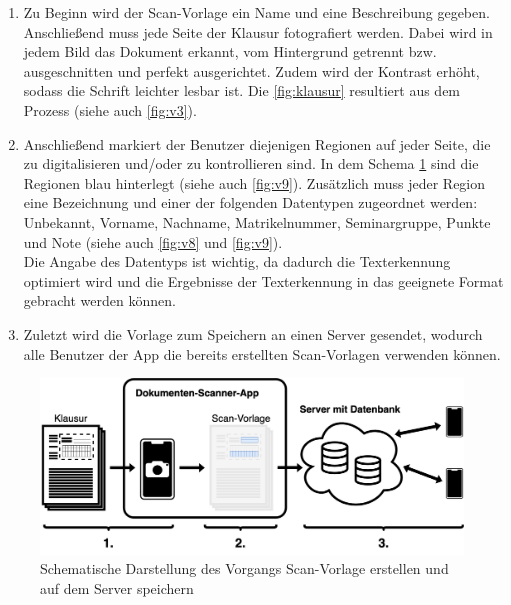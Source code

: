 \documentclass[notables, nomenclature, oneside, 150]{HSMW-Thesis}
\begin{document}
		\begin{enumerate}
			\item Zu Beginn wird der Scan-Vorlage ein Name und eine Beschreibung gegeben. Anschließend muss jede Seite der Klausur fotografiert werden. Dabei wird in jedem Bild das Dokument erkannt, vom Hintergrund getrennt bzw. ausgeschnitten und perfekt ausgerichtet. Zudem wird der Kontrast erhöht, sodass die Schrift leichter lesbar ist. Die \autoref{fig:klausur} resultiert aus dem Prozess (siehe auch \autoref{fig:v3}). 
		
			\item Anschließend markiert der Benutzer diejenigen Regionen auf jeder Seite, die zu digitalisieren und/oder zu kontrollieren sind. In dem Schema \ref{fig:schema1} sind die Regionen blau hinterlegt (siehe auch \autoref{fig:v9}). Zusätzlich muss jeder Region eine Bezeichnung und einer der folgenden Datentypen zugeordnet werden: Unbekannt, Vorname, Nachname, Matrikelnummer, Seminargruppe, Punkte und Note (siehe auch \autoref{fig:v8} und \ref{fig:v9}).\\
			Die Angabe des Datentyps ist wichtig, da dadurch die Texterkennung optimiert wird und die Ergebnisse der Texterkennung in das geeignete Format gebracht werden können. \label{it:zwei}
			
			\item Zuletzt wird die Vorlage zum Speichern an einen Server gesendet, wodurch alle Benutzer der App die bereits erstellten Scan-Vorlagen verwenden können.
		\end{enumerate}
		
		\begin{figure}[h!]
    		\centering
    		\includegraphics[width=\textwidth]{img/schema1}
    		\caption{Schematische Darstellung des Vorgangs Scan-Vorlage erstellen und auf dem Server speichern}
    		\label{fig:schema1}
    	\end{figure}
		
\end{document}
